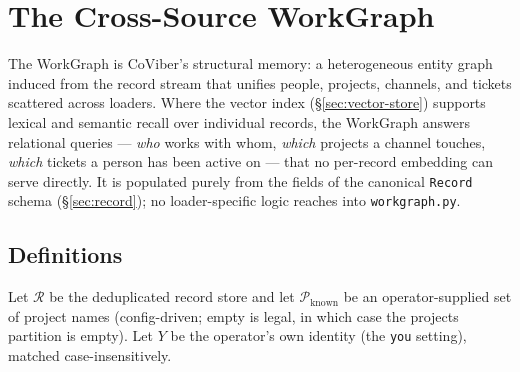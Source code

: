 
\section{The Cross-Source WorkGraph}
\label{sec:workgraph}

The WorkGraph is CoViber's structural memory: a heterogeneous entity graph induced from the record stream that unifies people, projects, channels, and tickets scattered across loaders. Where the vector index (\S\ref{sec:vector-store}) supports lexical and semantic recall over individual records, the WorkGraph answers relational queries — \emph{who} works with whom, \emph{which} projects a channel touches, \emph{which} tickets a person has been active on — that no per-record embedding can serve directly. It is populated purely from the fields of the canonical \texttt{Record} schema (\S\ref{sec:record}); no loader-specific logic reaches into \texttt{workgraph.py}.

\subsection{Definitions}
\label{sec:workgraph-defs}

Let $\mathcal{R}$ be the deduplicated record store and let $\mathcal{P}_{\text{known}}$ be an operator-supplied set of project names (config-driven; empty is legal, in which case the projects partition is empty). Let $Y$ be the operator's own identity (the \texttt{you} setting), matched case-insensitively.

